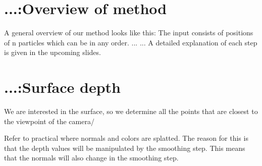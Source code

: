 \documentclass{article}
\begin{document}
\section{...:Overview of method}
A general overview of our method looks like this:
The input consists of positions of n particles which can be in any order.
...
...
A detailed explanation of each step is given in the upcoming slides.

\section{...:Surface depth}
We are interested in the surface, so we determine all the points that are closest to the viewpoint of the camera/

Refer to practical where normals and colors are splatted.
The reason for this is that the depth values will be manipulated by the smoothing step.
This means that the normals will also change in the smoothing step.
\end{document}
